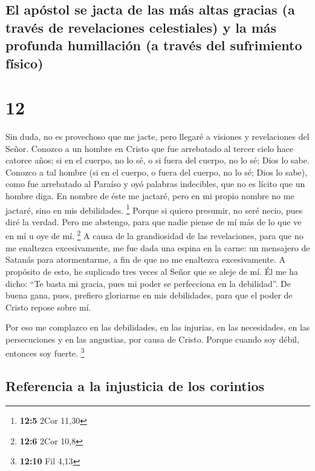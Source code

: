\begin{paracol}{2}
{\subsection{El apóstol se jacta de las más altas gracias (a través de
revelaciones celestiales) y la más profunda humillación (a través del
sufrimiento
físico)}\label{el-apuxf3stol-se-jacta-de-las-muxe1s-altas-gracias-a-travuxe9s-de-revelaciones-celestiales-y-la-muxe1s-profunda-humillaciuxf3n-a-travuxe9s-del-sufrimiento-fuxedsico}}

\hypertarget{section-22}{%
\section{12}\label{section-22}}

 Sin duda, no es provechoso que me jacte, pero llegaré a
visiones y revelaciones del Señor.  Conozco a un hombre en
Cristo que fue arrebatado al tercer cielo hace catorce años; si en el
cuerpo, no lo sé, o si fuera del cuerpo, no lo sé; Dios lo sabe.
 Conozco a tal hombre (si en el cuerpo, o fuera del
cuerpo, no lo sé; Dios lo sabe),  como fue arrebatado al
Paraíso y oyó palabras indecibles, que no es lícito que un hombre diga.
 En nombre de éste me jactaré, pero en mi propio nombre no
me jactaré, sino en mis debilidades. \footnote{\textbf{12:5} 2Cor 11,30}
 Porque si quiero presumir, no seré necio, pues diré la
verdad. Pero me abstengo, para que nadie piense de mí más de lo que ve
en mí u oye de mí. \footnote{\textbf{12:6} 2Cor 10,8}  A
causa de la grandiosidad de las revelaciones, para que no me enaltezca
excesivamente, me fue dada una espina en la carne: un mensajero de
Satanás para atormentarme, a fin de que no me enaltezca excesivamente.
 A propósito de esto, he suplicado tres veces al Señor que
se aleje de mí.  Él me ha dicho: ``Te basta mi gracia,
pues mi poder se perfecciona en la debilidad''. De buena gana, pues,
prefiero gloriarme en mis debilidades, para que el poder de Cristo
repose sobre mí.

 Por eso me complazco en las debilidades, en las
injurias, en las necesidades, en las persecuciones y en las angustias,
por causa de Cristo. Porque cuando soy débil, entonces soy fuerte.
\footnote{\textbf{12:10} Fil 4,13}

\hypertarget{referencia-a-la-injusticia-de-los-corintios}{%
\subsection{Referencia a la injusticia de los
corintios}\label{referencia-a-la-injusticia-de-los-corintios}}


\end{paracol}
